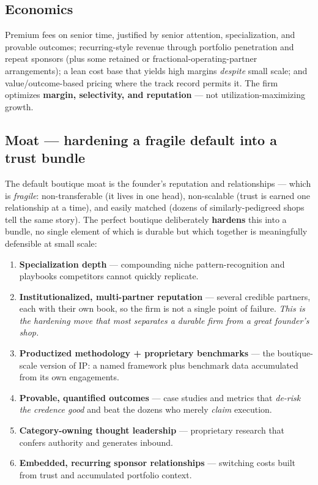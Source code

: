 \documentclass[11pt]{article}
\begin{document}
\subsection{Economics}
Premium fees on senior time, justified by senior attention, specialization, and provable
outcomes; recurring-style revenue through portfolio penetration and repeat sponsors (plus
some retained or fractional-operating-partner arrangements); a lean cost base that yields
high margins \emph{despite} small scale; and value/outcome-based pricing where the track
record permits it. The firm optimizes \textbf{margin, selectivity, and reputation} --- not
utilization-maximizing growth.

\subsection{Moat --- hardening a fragile default into a trust bundle}
The default boutique moat is the founder's reputation and relationships --- which is
\emph{fragile}: non-transferable (it lives in one head), non-scalable (trust is earned one
relationship at a time), and easily matched (dozens of similarly-pedigreed shops tell the
same story). The perfect boutique deliberately \textbf{hardens} this into a bundle, no
single element of which is durable but which together is meaningfully defensible at small
scale:

\begin{enumerate}
  \item \textbf{Specialization depth} --- compounding niche pattern-recognition and
  playbooks competitors cannot quickly replicate.
  \item \textbf{Institutionalized, multi-partner reputation} --- several credible partners,
  each with their own book, so the firm is not a single point of failure. \emph{This is the
  hardening move that most separates a durable firm from a great founder's shop.}
  \item \textbf{Productized methodology + proprietary benchmarks} --- the boutique-scale
  version of IP: a named framework plus benchmark data accumulated from its own engagements.
  \item \textbf{Provable, quantified outcomes} --- case studies and metrics that
  \emph{de-risk the credence good} and beat the dozens who merely \emph{claim} execution.
  \item \textbf{Category-owning thought leadership} --- proprietary research that confers
  authority and generates inbound.
  \item \textbf{Embedded, recurring sponsor relationships} --- switching costs built from
  trust and accumulated portfolio context.
\end{enumerate}
\end{document}
